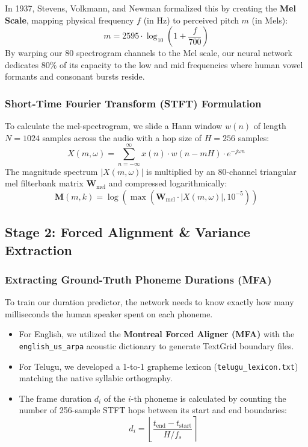 \documentclass[11pt,a4paper]{article}
\begin{document}
In 1937, Stevens, Volkmann, and Newman formalized this by creating the \textbf{Mel Scale}, mapping physical frequency $f$ (in Hz) to perceived pitch $m$ (in Mels):
\begin{equation}
m = 2595 \cdot \log_{10}\left(1 + \frac{f}{700}\right)
\end{equation}
By warping our 80 spectrogram channels to the Mel scale, our neural network dedicates 80\% of its capacity to the low and mid frequencies where human vowel formants and consonant bursts reside.

\subsubsection{Short-Time Fourier Transform (STFT) Formulation}
To calculate the mel-spectrogram, we slide a Hann window $w(n)$ of length $N = 1024$ samples across the audio with a hop size of $H = 256$ samples:
\begin{equation}
X(m, \omega) = \sum_{n=-\infty}^{\infty} x(n) \cdot w(n - mH) \cdot e^{-j \omega n}
\end{equation}
The magnitude spectrum $|X(m, \omega)|$ is multiplied by an 80-channel triangular mel filterbank matrix $\mathbf{W}_{\text{mel}}$ and compressed logarithmically:
\begin{equation}
\mathbf{M}(m, k) = \log\left( \max(\mathbf{W}_{\text{mel}} \cdot |X(m, \omega)|, 10^{-5}) \right)
\end{equation}

\subsection{Stage 2: Forced Alignment \& Variance Extraction}

\subsubsection{Extracting Ground-Truth Phoneme Durations (MFA)}
To train our duration predictor, the network needs to know exactly how many milliseconds the human speaker spent on each phoneme.
\begin{itemize}
  \item For English, we utilized the \textbf{Montreal Forced Aligner (MFA)} with the \texttt{english\_us\_arpa} acoustic dictionary to generate TextGrid boundary files.
  \item For Telugu, we developed a 1-to-1 grapheme lexicon (\texttt{telugu\_lexicon.txt}) matching the native syllabic orthography.
  \item The frame duration $d_i$ of the $i$-th phoneme is calculated by counting the number of 256-sample STFT hops between its start and end boundaries:
  \begin{equation}
  d_i = \left\lfloor \frac{t_{\text{end}} - t_{\text{start}}}{H / f_s} \right\rceil
  \end{equation}
\end{itemize}
\end{document}
